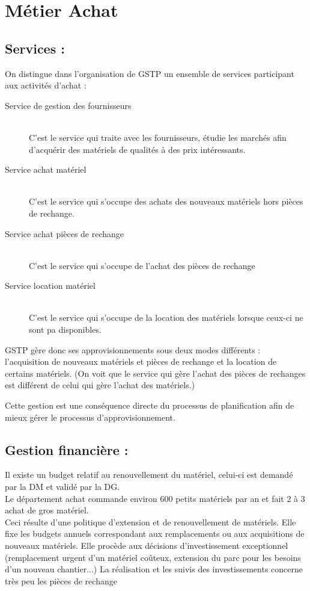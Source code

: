\section{Métier Achat}


\subsection{Services :}
On distingue dans l'organisation de GSTP un ensemble de services participant aux activités d'achat :
\begin{description}

   \item[Service de gestion des fournisseurs]~\\
        C'est le service qui traite avec les fournisseurs, étudie les marchés afin d'acquérir des matériels de qualités à des prix intéressants.

    \item[Service achat matériel]~\\
        C'est le service qui s'occupe des achats des nouveaux matériels hors pièces de rechange.

    \item[Service achat pièces de rechange]~\\
        C'est le service qui s'occupe de l'achat des pièces de rechange

    \item[Service location matériel]~\\
        C'est le service qui s'occupe de la location des matériels lorsque ceux-ci ne sont pa disponibles.
\end{description}


GSTP gère donc ses approvisionnements sous deux modes différents :\\
l'acquisition de nouveaux matériels et pièces de rechange et la location de certains matériels.
(On voit que le service qui gère l'achat des pièces de rechanges est différent de celui qui gère l'achat des matériels.)

Cette gestion est une conséquence directe du processus de planification afin de mieux gérer le processus d'approvisionnement.

\subsection{Gestion financière :}
Il existe un budget relatif au renouvellement du matériel, celui-ci est demandé par la DM et validé par la DG. \\
Le département achat commande environ 600 petits matériels par an et fait 2 à 3 achat de gros matériel. \\
Ceci résulte d'une politique d'extension et de renouvellement de matériels. Elle fixe les budgets annuels correspondant aux remplacements ou aux acquisitions de nouveaux matériels. Elle procède aux décisions d'investissement exceptionnel (remplacement urgent d'un matériel coûteux, extension du parc pour les besoins d'un nouveau chantier...)
La réalisation et les suivis des investissements concerne très peu les pièces de rechange



